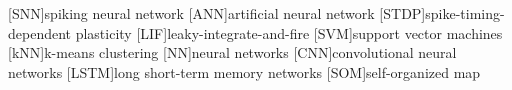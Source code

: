 \begin{acronym}[XXXX]
    [SNN]{spiking neural network}
    [ANN]{artificial neural network}
    [STDP]{spike-timing-dependent plasticity}
    [LIF]{leaky-integrate-and-fire}
    [SVM]{support vector machines}
    [kNN]{k-means clustering}
    [NN]{neural networks}
    [CNN]{convolutional neural networks}
    [LSTM]{long short-term memory networks}
    [SOM]{self-organized map}
\end{acronym}